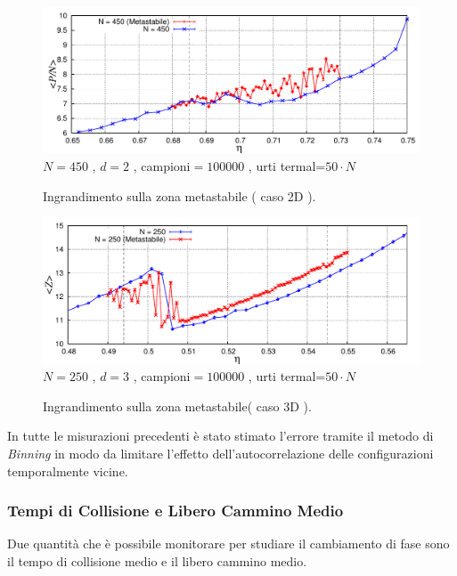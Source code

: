 \documentclass[11pt]{article}
\theoremstyle{plain}
\theoremstyle{remark}
\begin{document}
\begin{figure}[!ht]
\centering
\caption[Sfere Rigide$/$PvsEta\_2D\_ZonaMeta.cpp]{Ingrandimento sulla zona metastabile ( caso 2D ).} 	\vspace{-15pt}
\includegraphics[scale=0.85]{Immagini/Rigide/PvsEta2DZoom}
	\newline \footnotesize{$N= 450$ , $d=2$ , campioni$= 100000$ ,  urti termal=$ 50 \cdot N$}
	\label{fig: PvsEta2D_Zoom}
\end{figure}
\begin{figure}[!ht]
\centering
\caption[Sfere Rigide$/$PvsEta\_3D\_ZonaMeta.cpp]{Ingrandimento sulla zona metastabile( caso 3D ).} 	\vspace{-15pt}
\includegraphics[scale=0.85]{Immagini/Rigide/PvsEta3DZoom}
	\newline \footnotesize{$N= 250$ , $d=3$ , campioni$= 100000$ ,  urti termal=$ 50 \cdot N$}
	\label{fig: PvsEta3D_Zoom}
\end{figure}

In tutte le misurazioni precedenti è stato stimato l'errore tramite il metodo di \emph{Binning} in modo da limitare l'effetto dell'autocorrelazione delle configurazioni temporalmente vicine.

\FloatBarrier 
\subsubsection{Tempi di Collisione e Libero Cammino Medio}
Due quantità che è possibile monitorare per studiare il cambiamento di fase sono il tempo di collisione medio e il libero cammino medio.
\end{document}
